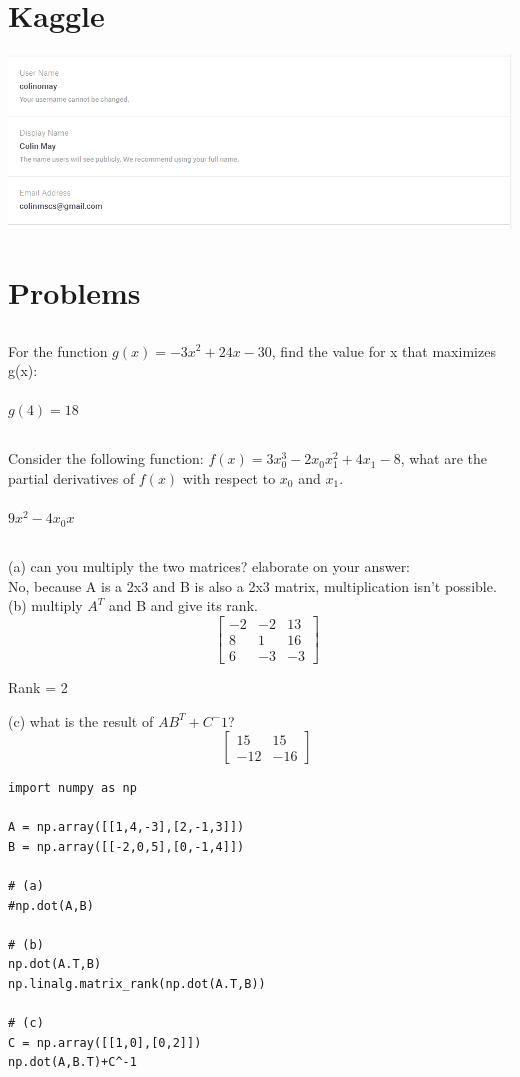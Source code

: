 \documentclass[a4paper]{article}
\begin{document}
\section{Kaggle}
\includegraphics{kaggle}

\section{Problems}
\subsection{}
For the function $g(x) = −3x^2 + 24x - 30$, find the value for x that maximizes g(x): \\\\
\indent
$g(4) = 18$
\subsection{}
Consider the following function: $f(x) = 3x^3_0 - 2x_0x^2_1 + 4x_1 - 8$, what are the partial derivatives of $f(x)$ with respect to $x_0$ and $x_1$. \\\\
\indent
$9x^2-4x_0x$
\subsection{}
(a) can you multiply the two matrices? elaborate on your answer: \\
\indent
No, because A is a 2x3 and B is also a 2x3 matrix, multiplication isn't possible. \\
(b)  multiply $A^T$ and B and give its rank.
$$
\quad
\begin{bmatrix} 
-2 & -2 & 13 \\
8 & 1 & 16 \\
6 & -3 & -3
\end{bmatrix}
$$ 
\begin{center}
   Rank = 2 \\ 
\end{center}
(c)  what is the result of $AB^T + C^-1$?
$$
\quad
\begin{bmatrix} 
15 & 15 \\
-12 & -16
\end{bmatrix}
$$
\begin{lstlisting}[frame=single]
import numpy as np

A = np.array([[1,4,-3],[2,-1,3]])
B = np.array([[-2,0,5],[0,-1,4]])

# (a)
#np.dot(A,B) 

# (b)
np.dot(A.T,B)
np.linalg.matrix_rank(np.dot(A.T,B))

# (c)
C = np.array([[1,0],[0,2]])
np.dot(A,B.T)+C^-1
\end{lstlisting}
\end{document}
